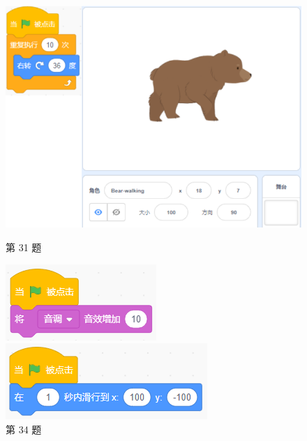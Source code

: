 \documentclass[10pt, a4paper]{article}
\begin{document}
\begin{enumerate}
        \begin{figure}[htbp]
            \centering
            \begin{minipage}[t]{.28\textwidth}
                \centering
                \includegraphics[width=\textwidth]{31.png}
                \caption*{第 31 题}
            \end{minipage}
            \begin{minipage}[t]{.18\textwidth}
                \centering
                \includegraphics[width=\textwidth]{34.png}
                \caption*{第 34 题}
            \end{minipage}
            \begin{minipage}[t]{.5\textwidth}
                \centering
                \begin{minipage}[t]{.4\textwidth}
                    \centering
                    \includegraphics[width=\textwidth]{35-1.png}

\end{minipage}
\end{minipage}
\end{figure}
\end{enumerate}
\end{document}

